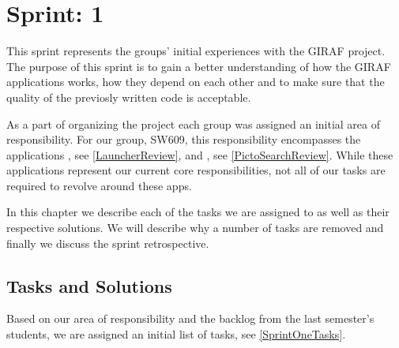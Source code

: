 \chapter{Sprint: 1}
This sprint represents the groups' initial experiences with the GIRAF
project. The purpose of this sprint is to gain a better understanding of how the
GIRAF applications works, how they depend on each other and to make sure that
the quality of the previosly written code is acceptable.\nl

As a part of organizing the project each group was assigned an initial area of
responsibility. For our group, SW609, this responsibility encompasses the
applications , see \autoref{LauncherReview}, and
, see \autoref{PictoSearchReview}. While these
applications represent our current core responsibilities, not all of our tasks
are required to revolve around these apps.\nl

In this chapter we describe each of the tasks we are assigned to as
well as their respective solutions. We will describe why a number of tasks are
removed and finally we discuss the sprint retrospective.

\section{Tasks and Solutions}\label{TaS1}
Based on our area of responsibility and the backlog from the last semester's
students, we are assigned an initial list of tasks, see
\autoref{SprintOneTasks}.


